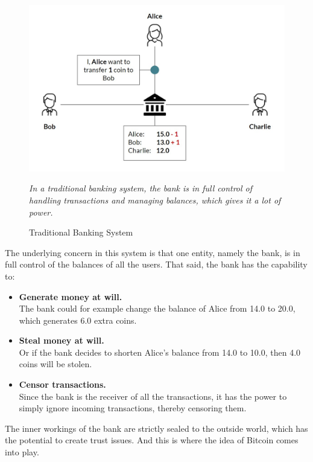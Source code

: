 \documentclass[a4paper, 12pt]{report}
\begin{document}
\begin{figure}[H]
	\includegraphics[width=\textwidth]{01_Banking_System}
	\caption{Traditional Banking System}
	\medskip
	\small \textit{In a traditional banking system, the bank is in full control of handling transactions and managing balances, which gives it a lot of power.}
	\label{fig:01_Banking_System}
\end{figure}

\par The underlying concern in this system is that one entity, namely the bank, is in full control of the balances of all the users. That said, the bank has the capability to:

\begin{itemize}
	\item \textbf{Generate money at will.}\\The bank could for example change the balance of Alice from 14.0 to 20.0, which generates 6.0 extra coins.
	\item \textbf{Steal money at will.}\\Or if the bank decides to shorten Alice’s balance from 14.0 to 10.0, then 4.0 coins will be stolen.
	\item \textbf{Censor transactions.}\\Since the bank is the receiver of all the transactions, it has the power to simply ignore incoming transactions, thereby censoring them.
\end{itemize}

\par The inner workings of the bank are strictly sealed to the outside world, which has the potential to create trust issues. And this is where the idea of Bitcoin comes into play.
\end{document}
